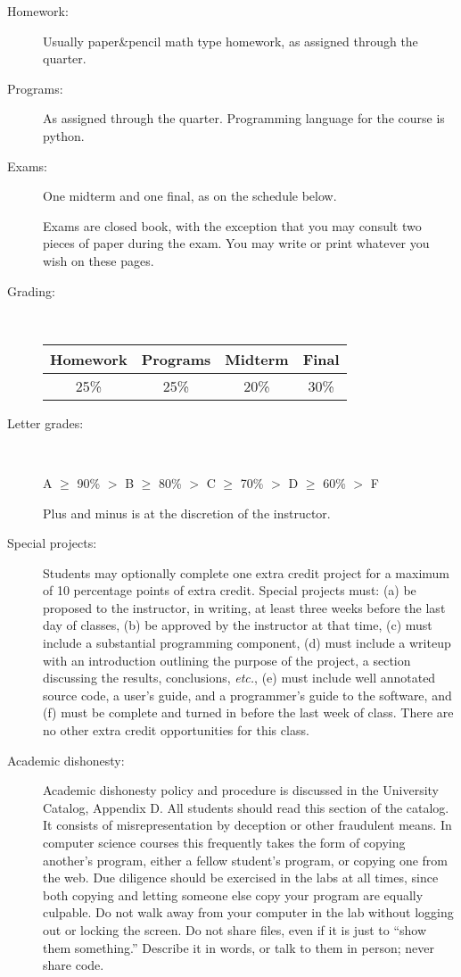 \documentclass[]{article}
\begin{document}
\begin{description}
\item[Homework:] Usually paper\&pencil math type homework, as assigned
  through the quarter.

\item[Programs:] As assigned through the quarter.  Programming
  language for the course is python. 

\item[Exams:]
  One midterm and one final, as on the schedule below.

  Exams are closed book, with the exception that you may
  consult two pieces of paper during the exam.  You may write or print
  whatever you wish on these pages.

\item[Grading:] ~

\begin{tabular}{|c|c|c|c|}\hline
Homework & Programs &  Midterm & Final \\\hline
25\% & 25\% & 20\% & 30\%  \\\hline
\end{tabular}

\item[Letter grades:] ~

A $\geq$ 90\%  $>$ B  $\geq$ 80\% $>$ C $\geq$
  70\% $>$ D  $\geq$ 60\% $>$ F

  Plus and minus is at the discretion of the instructor.

\item[Special projects:] Students may optionally complete one extra
  credit project for a maximum of 10 percentage points of extra
  credit.  Special projects must: (a) be proposed to the instructor,
  in writing, at least three weeks before the last day of classes,
  (b) be approved by the instructor at that time, (c) must include a
  substantial programming component, (d) must include a writeup with
  an introduction outlining the purpose of the project, a section
  discussing the results, conclusions, {\em etc.}, (e) must include
  well annotated source code, a user's guide, and a programmer's guide
  to the software, and (f) must be complete and turned in before the
  last week of class.  There are no other extra credit opportunities
  for this class.

\item[Academic dishonesty:] Academic dishonesty policy and procedure
  is discussed in the University Catalog, Appendix D.  All students
  should read this section of the catalog.  It consists of
  misrepresentation by deception or other fraudulent means.  In
  computer science courses this frequently takes the form of copying
  another's program, either a fellow student's program, or copying one
  from the web.  Due diligence should be exercised in the labs at all
  times, since both copying and letting someone else copy your program
  are equally culpable.  Do not walk away from your computer in the
  lab without logging out or locking the screen.  Do not share files,
  even if it is just to ``show them something.''  Describe it in
  words, or talk to them in person; never share code.


\end{description}
\end{document}
